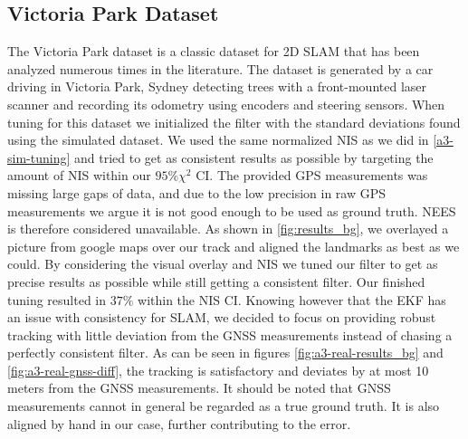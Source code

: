 \subsection{Victoria Park Dataset}
The Victoria Park dataset is a classic dataset for 2D SLAM that has been analyzed numerous times in the literature. The dataset is generated by a car driving in Victoria Park, Sydney detecting trees with a front-mounted laser scanner and recording its odometry using encoders and steering sensors. When tuning for this dataset we initialized the filter with the standard deviations found using the simulated dataset. We used the same normalized NIS as we did in \cref{a3-sim-tuning} and tried to get as consistent results as possible by targeting the amount of NIS within our $95\% \chi^2$ CI. The provided GPS measurements was missing large gaps of data, and due to the low precision in raw GPS measurements we argue it is not good enough to be used as ground truth. NEES is therefore considered unavailable. As shown in \cref{fig:results_bg}, we overlayed a picture from google maps over our track and aligned the landmarks as best as we could. By considering the visual overlay and NIS we tuned our filter to get as precise results as possible while still getting a consistent filter. Our finished tuning resulted in $37\%$ within the NIS CI. Knowing however that the EKF has an issue with consistency for SLAM, we decided to focus on providing robust tracking with little deviation from the GNSS measurements instead of chasing a perfectly consistent filter. As can be seen in figures \ref{fig:a3-real-results_bg} and \ref{fig:a3-real-gnss-diff}, the tracking is satisfactory and deviates by at most 10 meters from the GNSS measurements. It should be noted that GNSS measurements cannot in general be regarded as a true ground truth. It is also aligned by hand in our case, further contributing to the error.
